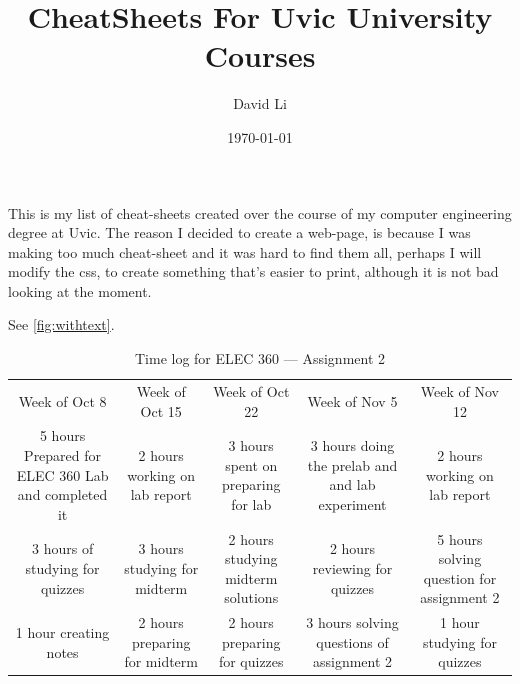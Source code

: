 \documentclass[12pt]{book}
\title{CheatSheets For Uvic University Courses}
\author{David Li}
\date{\today}
\begin{document}
\maketitle                      %

This is my list of cheat-sheets created over the course of my computer engineering degree at Uvic. The reason I decided to create a web-page, is because I was making too much cheat-sheet and it was hard to find them all, perhaps I will modify the css, to create something that's easier to print, although it is not bad looking at the moment.

See \ref{fig:withtext}.

\begin{table}
	\caption{\Large Time log for ELEC 360 --- Assignment 2}
	\begin{tabular}{c c c c c}
		Week of Oct 8 &                 Week of Oct 15 &                      Week of Oct 22 &                                    Week of Nov 5 &                             Week of Nov 12 \\
		5 hours Prepared for ELEC 360 Lab and completed it &  2 hours working on lab report &  3 hours spent on preparing for lab &  3 hours doing the prelab and and lab experiment &  2 hours working on lab report \\
		3 hours of studying for quizzes &  3 hours studying for midterm &  2 hours studying midterm solutions &  2 hours reviewing for quizzes &  5 hours solving question for assignment 2 \\
		1 hour creating notes &  2 hours preparing for midterm &  2 hours preparing for quizzes &  3 hours solving questions of assignment 2 &  1 hour studying for quizzes \\
	\end{tabular}
\end{table}


\listoffigures
\listoftables
\listofalgorithms
\listoftodos
\tableofcontents                %
\end{document}
